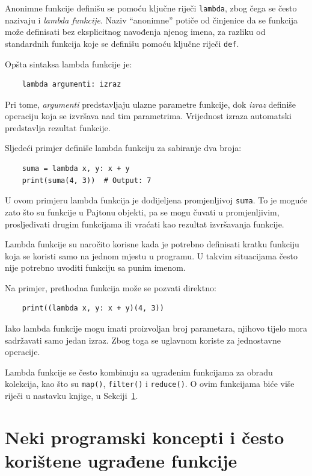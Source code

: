 Anonimne funkcije definišu se pomoću ključne riječi \texttt{lambda}, zbog čega se često nazivaju i \textit{lambda funkcije}. Naziv ``anonimne'' potiče od činjenice da se funkcija može definisati bez eksplicitnog navođenja njenog imena, za razliku od standardnih funkcija koje se definišu pomoću ključne riječi \texttt{def}.

Opšta sintaksa lambda funkcije je:

\begin{verbatim}
	lambda argumenti: izraz
\end{verbatim}

Pri tome, \textit{argumenti} predstavljaju ulazne parametre funkcije, dok \textit{izraz} definiše operaciju koja se izvršava nad tim parametrima. Vrijednost izraza automatski predstavlja rezultat funkcije.

Sljedeći primjer definiše lambda funkciju za sabiranje dva broja:

\begin{verbatim}
	suma = lambda x, y: x + y
	print(suma(4, 3))  # Output: 7
\end{verbatim}

U ovom primjeru lambda funkcija je dodijeljena promjenljivoj \texttt{suma}. To je moguće zato što su funkcije u Pajtonu objekti, pa se mogu čuvati u promjenljivim, prosljeđivati drugim funkcijama ili vraćati kao rezultat izvršavanja funkcije.

Lambda funkcije su naročito korisne kada je potrebno definisati kratku funkciju koja se koristi samo na jednom mjestu u programu. U takvim situacijama često nije potrebno uvoditi funkciju sa punim imenom.

Na primjer, prethodna funkcija može se pozvati direktno:

\begin{verbatim}
	print((lambda x, y: x + y)(4, 3))
\end{verbatim}

Iako lambda funkcije mogu imati proizvoljan broj parametara, njihovo tijelo mora sadržavati samo jedan izraz. Zbog toga se uglavnom koriste za jednostavne operacije.

Lambda funkcije se često kombinuju sa ugrađenim funkcijama za obradu kolekcija, kao što su \texttt{map()}, \texttt{filter()} i \texttt{reduce()}. O ovim funkcijama biće više riječi u nastavku knjige, u Sekciji~\ref{sec:concepts-pyhton}.


\section{Neki programski koncepti i često korištene ugrađene funkcije}
\label{sec:concepts-pyhton}

